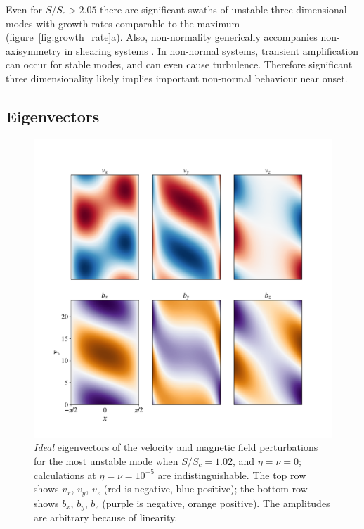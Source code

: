 \documentclass[openacc]{rsproca_new}%
\newcommand{\SSC}{S/S_{c}}
\begin{document}
Even for $\SSC> 2.05$ there are significant swaths of unstable three-dimensional modes with growth rates comparable to the maximum (figure~\ref{fig:growth_rate}a).
Also, non-normality generically accompanies non-axisymmetry in shearing systems \cite{1992MNRAS.255P..25K}.
In non-normal systems, transient amplification can occur for stable modes, and can even cause turbulence.
Therefore significant three dimensionality likely implies important non-normal behaviour near onset.

\subsection{Eigenvectors}
\label{sec:eigenvectors}

\begin{figure}[h!]
  \centering
  \includegraphics[width=\columnwidth]{eigvecs_xy_run_11_ideal_single_mode.pdf}
  \caption{\textit{Ideal} eigenvectors of the velocity and magnetic field perturbations for the most unstable mode when $\SSC=1.02$, and $\eta=\nu=0$; calculations at $\eta=\nu=10^{-5}$ are indistinguishable.
  The top row shows $v_{x}$, $v_{y}$, $v_{z}$ (red is negative, blue positive); the bottom row shows $b_{x}$, $b_{y}$, $b_{z}$ (purple is negative, orange positive). 
The amplitudes are arbitrary because of linearity.}
  \label{fig:eigvec}
\end{figure}
\end{document}
